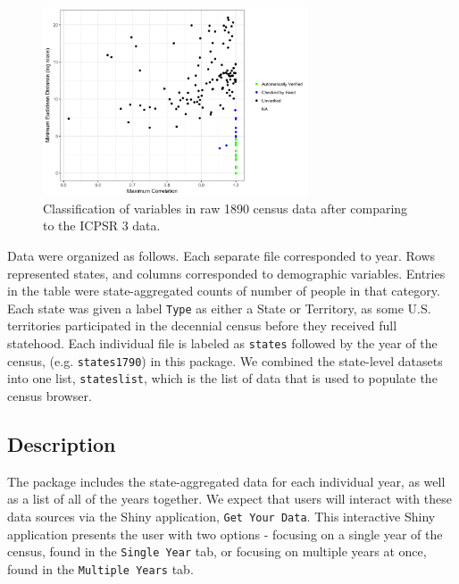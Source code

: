\documentclass[11pt,]{article}
\begin{document}
\begin{figure}[htbp]
\centering
\includegraphics[width=0.70000\textwidth]{./figures/verification.png}
\caption{Classification of variables in raw 1890 census data after
comparing to the ICPSR 3 data.}
\end{figure}

Data were organized as follows. Each separate file corresponded to year.
Rows represented states, and columns corresponded to demographic
variables. Entries in the table were state-aggregated counts of number
of people in that category. Each state was given a label \texttt{Type}
as either a State or Territory, as some U.S. territories participated in
the decennial census before they received full statehood. Each
individual file is labeled as \texttt{states} followed by the year of
the census, (e.g. \texttt{states1790}) in this package. We combined the
state-level datasets into one list, \texttt{stateslist}, which is the
list of data that is used to populate the census browser.

\subsection{Description}

The package includes the state-aggregated data for each individual year,
as well as a list of all of the years together. We expect that users
will interact with these data sources via the Shiny application,
\texttt{Get\ Your\ Data}. This interactive Shiny application presents
the user with two options - focusing on a single year of the census,
found in the \texttt{Single\ Year} tab, or focusing on multiple years at
once, found in the \texttt{Multiple\ Years} tab.
\end{document}
